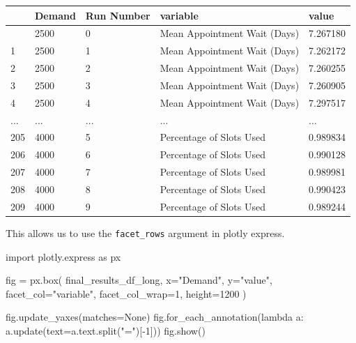 \documentclass[
  letterpaper,
  DIV=11,
  numbers=noendperiod]{scrreprt}
\newenvironment{Shaded}{}{}
\newcommand{\DecValTok}[1]{\textcolor[rgb]{0.00,0.36,0.77}{#1}}
\newcommand{\ImportTok}[1]{\textcolor[rgb]{0.01,0.18,0.38}{#1}}
\newcommand{\KeywordTok}[1]{\textcolor[rgb]{0.84,0.23,0.29}{#1}}
\newcommand{\NormalTok}[1]{\textcolor[rgb]{0.14,0.16,0.18}{#1}}
\newcommand{\OperatorTok}[1]{\textcolor[rgb]{0.14,0.16,0.18}{#1}}
\newcommand{\StringTok}[1]{\textcolor[rgb]{0.01,0.18,0.38}{#1}}
\newcommand{\VariableTok}[1]{\textcolor[rgb]{0.89,0.38,0.04}{#1}}
\begin{document}
\begin{longtable}[]{@{}lllll@{}}
\toprule\noalign{}
& Demand & Run Number & variable & value \\
\midrule\noalign{}
\endhead
\bottomrule\noalign{}
\endlastfoot
0 & 2500 & 0 & Mean Appointment Wait (Days) & 7.267180 \\
1 & 2500 & 1 & Mean Appointment Wait (Days) & 7.262172 \\
2 & 2500 & 2 & Mean Appointment Wait (Days) & 7.260255 \\
3 & 2500 & 3 & Mean Appointment Wait (Days) & 7.260905 \\
4 & 2500 & 4 & Mean Appointment Wait (Days) & 7.297517 \\
... & ... & ... & ... & ... \\
205 & 4000 & 5 & Percentage of Slots Used & 0.989834 \\
206 & 4000 & 6 & Percentage of Slots Used & 0.990128 \\
207 & 4000 & 7 & Percentage of Slots Used & 0.989981 \\
208 & 4000 & 8 & Percentage of Slots Used & 0.990423 \\
209 & 4000 & 9 & Percentage of Slots Used & 0.989244 \\
\end{longtable}

This allows us to use the \texttt{facet\_rows} argument in plotly
express.

\begin{Shaded}
\begin{Highlighting}[]
\ImportTok{import}\NormalTok{ plotly.express }\ImportTok{as}\NormalTok{ px}

\NormalTok{fig }\OperatorTok{=}\NormalTok{ px.box(}
\NormalTok{  final\_results\_df\_long,}
\NormalTok{  x}\OperatorTok{=}\StringTok{"Demand"}\NormalTok{,}
\NormalTok{  y}\OperatorTok{=}\StringTok{"value"}\NormalTok{,}
\NormalTok{  facet\_col}\OperatorTok{=}\StringTok{"variable"}\NormalTok{,}
\NormalTok{  facet\_col\_wrap}\OperatorTok{=}\DecValTok{1}\NormalTok{,}
\NormalTok{  height}\OperatorTok{=}\DecValTok{1200}
\NormalTok{)}

\NormalTok{fig.update\_yaxes(matches}\OperatorTok{=}\VariableTok{None}\NormalTok{)}
\NormalTok{fig.for\_each\_annotation(}\KeywordTok{lambda}\NormalTok{ a: a.update(text}\OperatorTok{=}\NormalTok{a.text.split(}\StringTok{"="}\NormalTok{)[}\OperatorTok{{-}}\DecValTok{1}\NormalTok{]))}
\NormalTok{fig.show()}
\end{Highlighting}
\end{Shaded}
\end{document}
